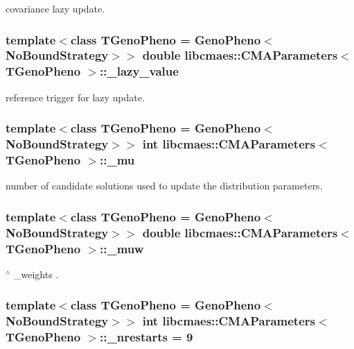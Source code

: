 covariance lazy update. \hypertarget{classlibcmaes_1_1CMAParameters_ae00e6b49bd99e1aa316bec03da96e95b}{
\subsubsection[{\-\_\-lazy\-\_\-value}]{\setlength{\rightskip}{0pt plus 5cm}template$<$class T\-Geno\-Pheno = Geno\-Pheno$<$\-No\-Bound\-Strategy$>$$>$ double {\bf libcmaes\-::\-C\-M\-A\-Parameters}$<$ T\-Geno\-Pheno $>$\-::\-\_\-lazy\-\_\-value}}\label{classlibcmaes_1_1CMAParameters_ae00e6b49bd99e1aa316bec03da96e95b}
reference trigger for lazy update. \hypertarget{classlibcmaes_1_1CMAParameters_a102a49af5856035c4568178f4847e2e8}{
\subsubsection[{\-\_\-mu}]{\setlength{\rightskip}{0pt plus 5cm}template$<$class T\-Geno\-Pheno = Geno\-Pheno$<$\-No\-Bound\-Strategy$>$$>$ int {\bf libcmaes\-::\-C\-M\-A\-Parameters}$<$ T\-Geno\-Pheno $>$\-::\-\_\-mu}}\label{classlibcmaes_1_1CMAParameters_a102a49af5856035c4568178f4847e2e8}
number of candidate solutions used to update the distribution parameters. \hypertarget{classlibcmaes_1_1CMAParameters_afc24dfb50427ae6963515f8508f5759d}{
\subsubsection[{\-\_\-muw}]{\setlength{\rightskip}{0pt plus 5cm}template$<$class T\-Geno\-Pheno = Geno\-Pheno$<$\-No\-Bound\-Strategy$>$$>$ double {\bf libcmaes\-::\-C\-M\-A\-Parameters}$<$ T\-Geno\-Pheno $>$\-::\-\_\-muw}}\label{classlibcmaes_1_1CMAParameters_afc24dfb50427ae6963515f8508f5759d}
$^\wedge$ \-\_\-weights . \hypertarget{classlibcmaes_1_1CMAParameters_a2ccf2865600fe20d965af9bdf9c6ab60}{
\subsubsection[{\-\_\-nrestarts}]{\setlength{\rightskip}{0pt plus 5cm}template$<$class T\-Geno\-Pheno = Geno\-Pheno$<$\-No\-Bound\-Strategy$>$$>$ int {\bf libcmaes\-::\-C\-M\-A\-Parameters}$<$ T\-Geno\-Pheno $>$\-::\-\_\-nrestarts = 9}}\label{classlibcmaes_1_1CMAParameters_a2ccf2865600fe20d965af9bdf9c6ab60}
